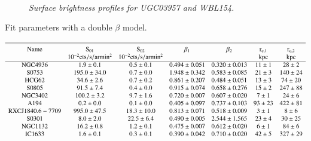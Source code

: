 \documentclass{aa} %
\begin{document}
\begin{appendix}

\begin{figure*}[ht]
\begin{center}
\hbox{
}
\end{center}
\vspace{-20pt}
\caption{\footnotesize{\it Surface brightness profiles for UGC03957 and WBL154.}}
\end{figure*}


\begin{table}[t]
  \caption{Fit parameters with a double $\beta$ model.}
$$
\centering
\begin{array}{ccccccc}
\hline\hline
\noalign{\smallskip}
{\rm Name} &  {\rm S_{01}} & {\rm S_{02}} & {\rm \beta_1} & {\rm \beta_2} & {\rm r_{c,1}} & {\rm r_{c,2}} \\
     	   &  10^{-2} {\rm cts/s/armin^2} & 10^{-2} {\rm cts/s/armin^2} & & & {\rm kpc} & {\rm kpc} \\  
\hline
{\rm NGC4936} 	 	 & 1.9\pm0.1 & 0.5\pm0.1 & 0.494\pm0.051 & 0.320\pm0.013 & 11\pm1 & 28\pm2 \\ 
{\rm S0753}  		 & 195.0\pm34.0 & 0.7\pm0.0 & 1.948\pm0.342 & 0.583\pm0.085 & 21\pm3 & 140\pm24 \\ 
{\rm HCG62}  	  	 & 34.6\pm2.6 & 0.7\pm0.2 & 0.861\pm0.207 & 0.484\pm0.051 & 13\pm3 & 74\pm20 \\ 
{\rm S0805}  		 & 91.5\pm7.4 & 0.4\pm0.0 & 0.915\pm0.074 & 0.658\pm0.276 & 15\pm2 & 247\pm88 \\ 
{\rm NGC3402}		 & 100.2\pm3.2 & 9.7\pm1.6 & 0.720\pm0.007 & 0.607\pm0.020  & 7\pm1 & 24\pm6 \\ 
{\rm A194 } 		 & 0.2\pm0.0 & 0.1\pm0.0 & 0.405\pm0.097 & 0.737\pm0.103 & 93\pm23 & 422\pm81 \\ 
{\rm RXCJ1840.6-7709} & 995.0\pm47.5 & 18.3\pm10.0 & 0.813\pm0.071 & 0.518\pm0.009 & 3\pm1 & 8\pm6 \\ 
{\rm S0301  }		 & 8.0\pm2.0 & 22.5\pm6.4 & 0.490\pm0.005 & 2.544\pm1.565 & 23\pm4 & 30\pm25 \\ 
{\rm NGC1132 }	 	 & 16.2\pm0.8 & 1.2\pm0.1 & 0.475\pm0.007 & 0.612\pm0.020 & 6\pm1 & 84\pm6 \\ 
{\rm IC1633 }		 & 1.6\pm0.1 & 0.3\pm0.1 & 0.390\pm0.042 & 0.710\pm0.020 & 42\pm5 & 327\pm29 \\ 

\end{array}$$
\end{table}
\end{appendix}
\end{document}
